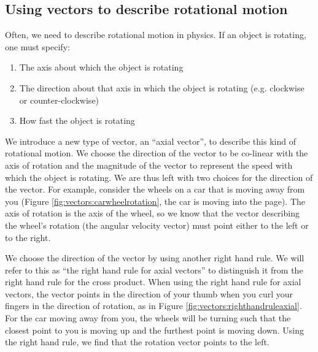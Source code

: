 \subsection{Using vectors to describe rotational motion}
\label{sec:Vectors:rotationalmotion}
Often, we need to describe rotational motion in physics. If an object is rotating, one must specify:
\begin{enumerate}
\item The axis about which the object is rotating
\item The direction about that axis in which the object is rotating (e.g. clockwise or counter-clockwise)
\item How fast the object is rotating
\end{enumerate}
We introduce a new type of vector, an ``axial vector'', to describe this kind of rotational motion. We choose the direction of the vector to be co-linear with the axis of rotation and the magnitude of the vector to represent the speed with which the object is rotating. We are thus left with two choices for the direction of the vector. For example, consider the wheels on a car that is moving away from you (Figure \ref{fig:vectors:carwheelrotation}, the car is moving into the page).  The axis of rotation is the axis of the wheel, so we know that the vector describing the wheel's rotation (the angular velocity vector) must point either to the left or to the right. 


We choose the direction of the vector by using another right hand rule. We will refer to this as ``the right hand rule for axial vectors'' to distinguish it from the right hand rule for the cross product.  When using the right hand rule for axial vectors, the vector points in the direction of your thumb when you curl your fingers in the direction of rotation, as in Figure \ref{fig:vectors:righthandruleaxial}. For the car moving away from you, the wheels will be turning such that the closest point to you is moving up and the furthest point is moving down. Using the right hand rule, we find that the rotation vector points to the left. 


